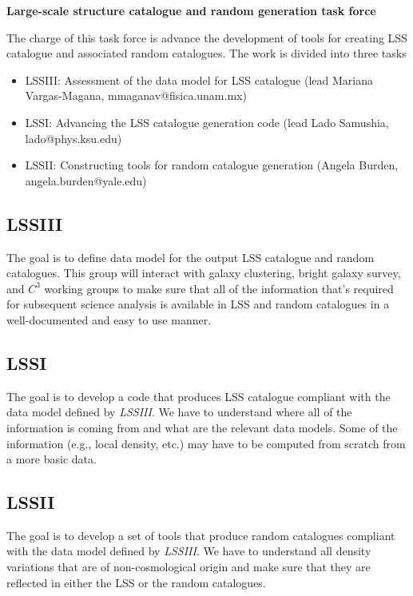 \documentclass[11pt]{article}
\begin{document}
\begin{center}
\Large{\textbf{Large-scale structure catalogue and random generation task force}}
\end{center}

The charge of this task force is advance the development of tools for creating
LSS catalogue and associated random catalogues. The work is divided into three
tasks
\begin{itemize}
\item LSSIII: Assessment of the data model for LSS catalogue (lead Mariana Vargas-Magana, mmaganav@fisica.unam.mx)
\item LSSI: Advancing the LSS catalogue generation code (lead Lado Samushia, lado@phys.ksu.edu)
\item LSSII: Constructing tools for random catalogue generation (Angela Burden, angela.burden@yale.edu)
\end{itemize}

\subsection*{LSSIII} The goal is to define data model for the output LSS
catalogue and random catalogues. This group will interact with galaxy
clustering, bright galaxy survey, and $C^3$ working groups to make sure that all
of the information that's required for subsequent science analysis is available
in LSS and random catalogues in a well-documented and easy to use manner.

\subsection*{LSSI} The goal is to develop a code that produces LSS catalogue
compliant with the data model defined by \textit{LSSIII}. We have to understand
where all of the information is coming from and what are the relevant data
models. Some of the information (e.g., local density, etc.) may have to be
computed from scratch from a more basic data.

\subsection*{LSSII} The goal is to develop a set of tools that produce random
catalogues compliant with the data model defined by \textit{LSSIII}. We have to
understand all density variations that are of non-cosmological origin and make
sure that they are reflected in either the LSS or the random catalogues.
\end{document}
